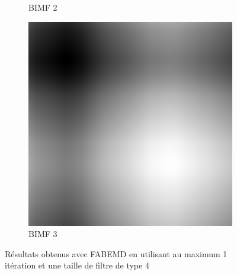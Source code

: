 \begin{figure}
\begin{subfigure}{.30\textwidth}
  \caption{BIMF 2}
\end{subfigure}
\begin{subfigure}{.30\textwidth}
  \centering
  \includegraphics[width=.9\linewidth]{img/s_1_4_3}
  \caption{BIMF 3}
\end{subfigure}
\caption{Résultats obtenus avec FABEMD en utilisant au maximum 1 itération et une taille de filtre de type 4}
\label{fig:s_1_4}
\end{figure}

